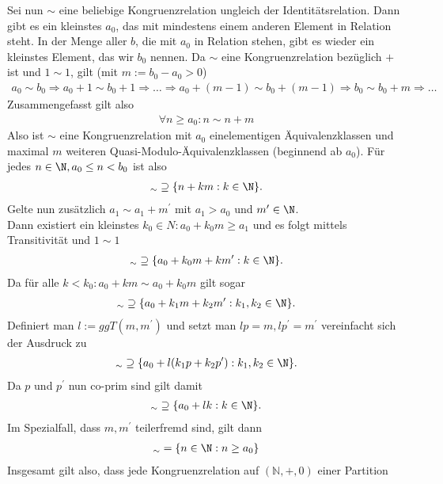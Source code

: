 \begin{solution}
\begin{itemize}
Sei nun $\sim$ eine beliebige Kongruenzrelation ungleich der Identitätsrelation.
Dann gibt es ein kleinstes $a_{0}$, das mit mindestens einem anderen Element in Relation steht. In der Menge aller $b$, die mit $a_{0}$ in
Relation stehen, gibt es wieder ein kleinstes Element, das wir $b_{0}$ nennen. Da $\sim$ eine Kongruenzrelation bezüglich $+$ ist und $1
\sim 1$, gilt (mit $m := b_{0}-a_{0} > 0$)
\begin{align*}
  a_{0} \sim b_{0} \Rightarrow a_{0}+1 \sim b_{0}+1 \Rightarrow \dots \Rightarrow a_{0}+(m-1) \sim b_{0}+(m-1) \Rightarrow b_{0} \sim
  b_{0}+m \Rightarrow \dots
\end{align*}
Zusammengefasst gilt also
\begin{align*}
  \forall n \geq a_0: n \sim n + m
\end{align*}
Also ist $\sim$ eine Kongruenzrelation mit $a_{0}$ einelementigen Äquivalenzklassen und maximal $m$ weiteren Quasi-Modulo-Äquivalenzklassen
(beginnend ab $a_{0}$).
Für jedes $n \in \N,a_0 \leq n < b_0$ ist also
\begin{align*}
  [n]_{\sim} \supseteq \{n + km: k \in \N\}.
\end{align*}
Gelte nun zusätzlich $a_1 \sim a_1 + m^{\prime}$ mit $a_1 > a_0$ und $m^{\prime} \in \N$. \\
Dann existiert ein kleinstes $k_0 \in N: a_0 + k_0m \geq a_1$ und es folgt mittels
Transitivität und $1 \sim 1$
\begin{align*}
  [a_0]_{\sim} \supseteq \{a_0 + k_0m + km^{\prime}: k \in \N\}.
\end{align*}
Da für alle $k < k_0: a_0 + km \sim a_0 + k_0m$ gilt sogar
\begin{align*}
  [a_0]_{\sim} \supseteq \{a_0 + k_1m + k_2m^{\prime}: k_1,k_2 \in \N\}.
\end{align*}
Definiert man $l := ggT(m,m^{\prime})$ und setzt man
$lp = m, lp^{\prime} = m^{\prime}$ vereinfacht sich der Ausdruck zu
\begin{align*}
  [a_0]_{\sim} \supseteq \{a_0 + l(k_1p + k_2p^{\prime}): k_1,k_2 \in \N\}.
\end{align*}
Da $p$ und $p^{\prime}$ nun co-prim sind gilt damit
\begin{align*}
  [a_0]_{\sim} \supseteq \{a_0 + lk: k \in \N\}.
\end{align*}
Im Spezialfall, dass $m, m^{\prime}$ teilerfremd sind, gilt dann
\begin{align*}
  [a_0]_{\sim} = \{n \in \N: n \geq a_0\}
\end{align*}
Insgesamt gilt also, dass jede Kongruenzrelation auf $(\mathbb{N},+,0)$ einer Partition

\end{itemize}
\end{solution}

